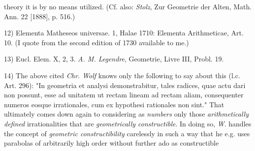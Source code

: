 \vfill
\leftline{\rule{2in}{0.4pt}}
\vspace{0.2cm}
{
\footnotesize
theory it is by no means utilized. (Cf. also: \textit{Stolz}, Zur Geometrie der Alten, Math. Ann. 22 [1888], p. 516.)

12) Elementa Matheseos universae. 1, Halae 1710: Elementa Arithmeticae, Art. 10. (I quote from the second edition of 1730 available to me.)

13) Eucl. Elem. X, 2, 3. \textit{A. M. Legendre}, Geometrie, Livre III, Probl. 19.

14) The above cited \textit{Chr. Wolf} knows only the following to say about this (l.c. Art. 296): "In geometria et analysi demonstrabitur, tales radices, quae actu dari non possunt, esse ad unitatem ut rectam lineam ad rectam aliam, consequenter numeros eosque irrationales, cum ex hypothesi rationales non sint." That ultimately comes down again to considering as \textit{numbers} only those \textit{arithmetically defined} irrationalities that are \textit{geometrically constructible}. In doing so, \textit{W}. handles the concept of \textit{geometric constructibility} carelessly in such a way that he e.g. uses parabolas of arbitrarily high order without further ado as constructible

}
